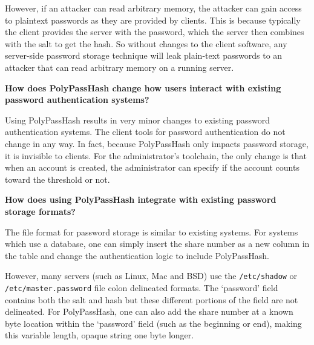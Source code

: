 However, if an attacker can read
arbitrary memory, the attacker can gain access to plaintext passwords
as they are provided by clients.    This is because typically the client
provides the server with the password, which the
server then combines with the salt to get the hash.  
So without changes to the client software, any server-side
password storage technique will leak plain-text passwords to an attacker
that can read arbitrary memory on a running server.



{\bf How does PolyPassHash change how users interact with existing password authentication systems?}

Using PolyPassHash results in very minor changes to existing password
authentication systems.   
%
The client tools for password authentication do not change in any way.   In 
fact, because PolyPassHash only impacts password storage, it is invisible to 
clients.   %
For the administrator's toolchain, the only change is that 
when an account is created, the administrator can specify if the account counts
toward the threshold or not.

{\bf How does using PolyPassHash integrate with existing password storage 
formats?}

The file format for password storage is similar to existing systems.
For systems which use a database, one can simply insert the share number
as a new column in the table and change the authentication logic to include
PolyPassHash.   

However, 
many servers (such as Linux, Mac and BSD) use the {\tt /etc/shadow} or 
{\tt /etc/master.password} file 
colon delineated formats.
The `password' field contains both the salt and hash but these
different portions of the field are not 
delineated.  
For PolyPassHash, one can also add the share number at a known byte location
within the `password' field (such as the beginning or end), making this
variable length, opaque string one byte longer.


